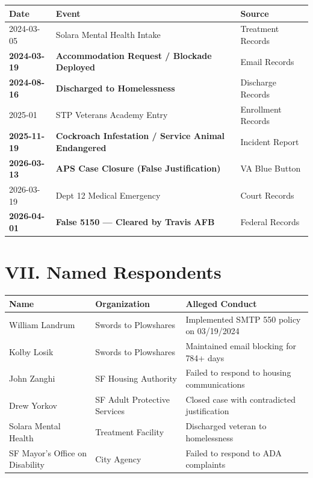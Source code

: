 \documentclass[11pt, a4paper]{article}
\begin{document}
\begin{center}
\begin{longtable}{p{2.5cm}p{6cm}p{4cm}}
\toprule
\textbf{Date} & \textbf{Event} & \textbf{Source} \\
\midrule
\endhead
2024-03-05 & Solara Mental Health Intake & Treatment Records \\
\textbf{2024-03-19} & \textbf{Accommodation Request / Blockade Deployed} & Email Records \\
\textbf{2024-08-16} & \textbf{Discharged to Homelessness} & Discharge Records \\
2025-01 & STP Veterans Academy Entry & Enrollment Records \\
\textbf{2025-11-19} & \textbf{Cockroach Infestation / Service Animal Endangered} & Incident Report \\
\textbf{2026-03-13} & \textbf{APS Case Closure (False Justification)} & VA Blue Button \\
2026-03-19 & Dept 12 Medical Emergency & Court Records \\
\textbf{2026-04-01} & \textbf{False 5150 --- Cleared by Travis AFB} & Federal Records \\
\bottomrule
\end{longtable}
\end{center}

\vspace{0.5cm}

\section{VII. Named Respondents}

\begin{center}
\begin{tabular}{p{3.5cm}p{3.5cm}p{6cm}}
\toprule
\textbf{Name} & \textbf{Organization} & \textbf{Alleged Conduct} \\
\midrule
William Landrum & Swords to Plowshares & Implemented SMTP 550 policy on 03/19/2024 \\
Kolby Losik & Swords to Plowshares & Maintained email blocking for 784+ days \\
John Zanghi & SF Housing Authority & Failed to respond to housing communications \\
Drew Yorkov & SF Adult Protective Services & Closed case with contradicted justification \\
Solara Mental Health & Treatment Facility & Discharged veteran to homelessness \\
SF Mayor's Office on Disability & City Agency & Failed to respond to ADA complaints \\
\bottomrule
\end{tabular}
\end{center}
\end{document}
